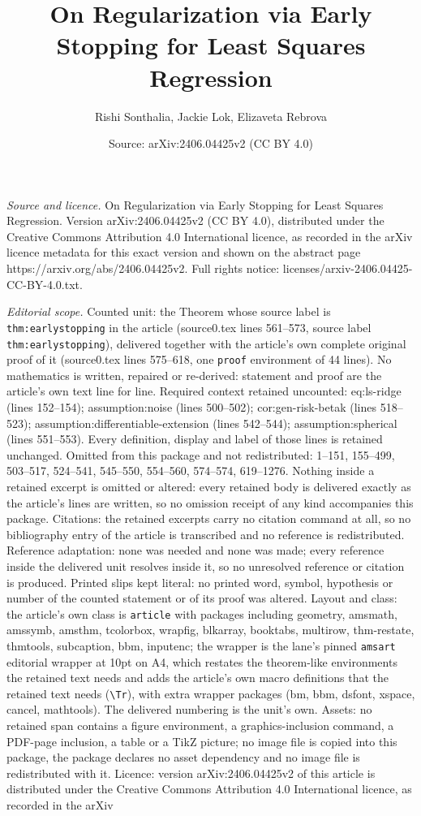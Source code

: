 \documentclass[10pt,a4paper]{amsart}
\title[On Regularization via Early Stopping for Least Squares Regre]{On Regularization via Early Stopping for Least Squares Regression}
\author{Rishi Sonthalia, Jackie Lok, Elizaveta Rebrova}
\date{Source: arXiv:2406.04425v2 (CC BY 4.0)}
\begin{document}
\maketitle

\noindent\emph{Source and licence.} On Regularization via Early Stopping for Least Squares Regression. Version arXiv:2406.04425v2 (CC BY 4.0), distributed under the Creative Commons Attribution 4.0 International licence, as recorded in the arXiv licence metadata for this exact version and shown on the abstract page https://arxiv.org/abs/2406.04425v2. Full rights notice: licenses/arxiv-2406.04425-CC-BY-4.0.txt.\par\smallskip

\noindent\textit{Editorial scope.} Counted unit: the Theorem whose source label is \texttt{thm:earlystopping} in the article (source0.tex lines 561--573, source label \texttt{thm:earlystopping}), delivered together with the article's own complete original proof of it (source0.tex lines 575--618, one \texttt{proof} environment of 44 lines). No mathematics is written, repaired or re-derived: statement and proof are the article's own text line for line. Required context retained uncounted: eq:ls-ridge (lines 152--154); assumption:noise (lines 500--502); cor:gen-risk-betak (lines 518--523); assumption:differentiable-extension (lines 542--544); assumption:spherical (lines 551--553). Every definition, display and label of those lines is retained unchanged. Omitted from this package and not redistributed: 1--151, 155--499, 503--517, 524--541, 545--550, 554--560, 574--574, 619--1276. Nothing inside a retained excerpt is omitted or altered: every retained body is delivered exactly as the article's lines are written, so no omission receipt of any kind accompanies this package. Citations: the retained excerpts carry no citation command at all, so no bibliography entry of the article is transcribed and no reference is redistributed. Reference adaptation: none was needed and none was made; every reference inside the delivered unit resolves inside it, so no unresolved reference or citation is produced. Printed slips kept literal: no printed word, symbol, hypothesis or number of the counted statement or of its proof was altered. Layout and class: the article's own class is \texttt{article} with packages including geometry, amsmath, amssymb, amsthm, tcolorbox, wrapfig, blkarray, booktabs, multirow, thm-restate, thmtools, subcaption, bbm, inputenc; the wrapper is the lane's pinned \texttt{amsart} editorial wrapper at 10pt on A4, which restates the theorem-like environments the retained text needs and adds the article's own macro definitions that the retained text needs (\texttt{\textbackslash Tr}), with extra wrapper packages (bm, bbm, dsfont, xspace, cancel, mathtools). The delivered numbering is the unit's own. Assets: no retained span contains a figure environment, a graphics-inclusion command, a PDF-page inclusion, a table or a TikZ picture; no image file is copied into this package, the package declares no asset dependency and no image file is redistributed with it. Licence: version arXiv:2406.04425v2 of this article is distributed under the Creative Commons Attribution 4.0 International licence, as recorded in the arXiv 
\end{document}
